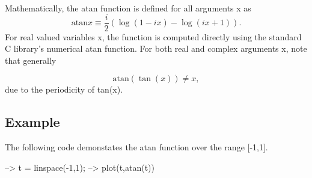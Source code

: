 Mathematically, the {\ttfamily atan} function is defined for all arguments {\ttfamily x} as \[ \mathrm{atan} x \equiv \frac{i}{2}\left(\log(1-i x) - \log(i x + 1)\right). \] For real valued variables {\ttfamily x}, the function is computed directly using the standard C library's numerical {\ttfamily atan} function. For both real and complex arguments {\ttfamily x}, note that generally

\[ \mathrm{atan}(\tan(x)) \neq x, \] due to the periodicity of {\ttfamily tan(x)}. \hypertarget{variables_struct_Example}{}\subsection{Example}\label{variables_struct_Example}
The following code demonstates the {\ttfamily atan} function over the range {\ttfamily \mbox{[}-\/1,1\mbox{]}}.


\begin{DoxyVerbInclude}
--> t = linspace(-1,1);
--> plot(t,atan(t))
\end{DoxyVerbInclude}


